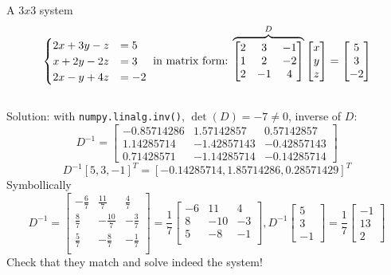\documentclass[8pt,dvipsnames]{beamer}
\begin{document}
  \begin{frame}
    A $3x3$ system
    $$
    \begin{cases}
      2x + 3y  -z &= 5\\
      x + 2y - 2z &= 3\\
      2x -y + 4z &=-2
    \end{cases}\text{ in matrix form: }
    \overset{D}{\overbrace{\begin{bmatrix}
      2 & 3 &-1\\
      1 & 2 &-2\\
      2&-1&4
    \end{bmatrix}}}
    \begin{bmatrix}
      x\\y\\z
    \end{bmatrix}=\begin{bmatrix}
      5\\3\\-2
    \end{bmatrix}
    $$
    \\Solution: with \texttt{numpy.linalg.inv()}, $\det(D)=-7\not=0$,  inverse of $D$:
    $$
    D^{-1} = 
    \begin{bmatrix}
      -0.85714286&  1.57142857&  0.57142857\\
       1.14285714& -1.42857143& -0.42857143\\
       0.71428571& -1.14285714& -0.14285714
    \end{bmatrix}
    $$
    $$
    D^{-1}[5,3,-1]^T = [-0.14285714,  1.85714286,  0.28571429]^T
    $$   
    Symbollically
    $$ D^{-1}=
    \begin{bmatrix}
   -\frac{6}{7} & \frac{11}{7} & \frac{4}{7} \\
    \frac{8}{7} & -\frac{10}{7} & -\frac{3}{7} \\
    \frac{5}{7} & -\frac{8}{7} & -\frac{1}{7} \\
    \end{bmatrix} = 
    \frac{1}{7}
    \begin{bmatrix}
     -6 & 11 & 4 \\
      8 & -10 & -3 \\
      5 & -8 & -1 \\
    \end{bmatrix},D^{-1}\begin{bmatrix}
      5\\3\\-1
    \end{bmatrix}=\frac17
    \begin{bmatrix}
    -1\\13\\2
    \end{bmatrix}
    $$
    Check that they match and solve indeed the system!
\end{frame}
\end{document}
